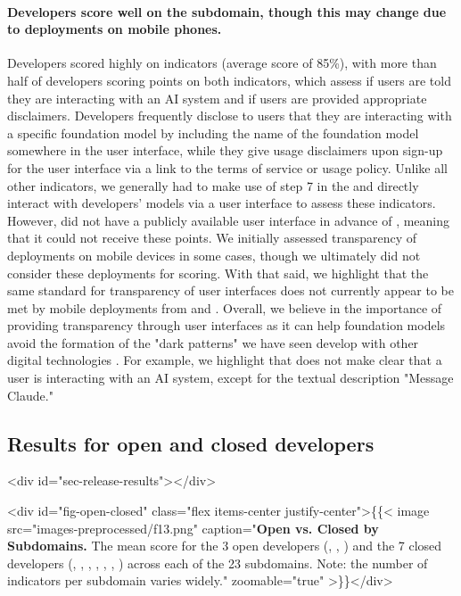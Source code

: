 \documentclass[screen, authorversion, acmsmall]{acmart}
\begin{document}
\paragraph{Developers score well on the \interface subdomain, though this may change due to deployments on mobile phones.}
Developers scored highly on \interface indicators (average score of 85\%), with more than half of developers scoring points on both indicators, which assess if users are told they are interacting with an AI system and if users are provided appropriate disclaimers. 
Developers frequently disclose to users that they are interacting with a specific foundation model by including the name of the foundation model somewhere in the user interface, while they give usage disclaimers upon sign-up for the user interface via a link to the terms of service or usage policy. 
Unlike all other indicators, we generally had to make use of step 7 in the and directly interact with developers' models via a user interface to assess these indicators. 
However, \amazon did not have a publicly available user interface in advance of \informationfreezedate, meaning that it could not receive these points. 
We initially assessed transparency of deployments on mobile devices in some cases, though we ultimately did not consider these deployments for scoring.
With that said, we highlight that the same standard for transparency of user interfaces does not currently appear to be met by mobile deployments from \openai and \inflection.
Overall, we believe in the importance of providing transparency through user interfaces as it can help foundation models avoid the formation of the "dark patterns" we have seen develop with other digital technologies \citep{10.1145/3359183}.
For example, we highlight that \anthropic does not make clear that a user is interacting with an AI system, except for the textual description "Message Claude."

\hypertarget{release-results}{\subsection{Results for open and closed developers}} <div id="sec-release-results"></div>

<div id="fig-open-closed" class="flex items-center justify-center">\{\{< image src="images-preprocessed/f13.png" caption="\textbf{Open vs. Closed by Subdomains.}  The mean score for the 3 open developers (\meta, \huggingface, \stability) and the 7 closed developers (\openai, \anthropic, \google, \cohere, \aitwentyone, \inflection, \amazon) across each of the 23 subdomains. Note: the number of indicators per subdomain varies widely." zoomable="true" >\}\}</div>
\end{document}
